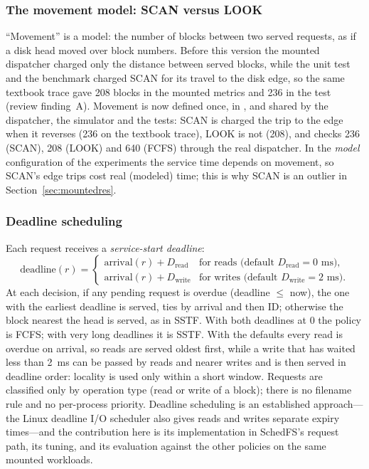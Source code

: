\documentclass[12pt,a4paper]{article}
\DeclareRobustCommand{\code}[1]{\texttt{\detokenize{#1}}}
\begin{document}
\subsubsection{The movement model: SCAN versus LOOK}
\label{sec:movement}
``Movement'' is a model: the number of blocks between two served requests, as if a disk head moved over block numbers. Before this version the mounted dispatcher charged only the distance between served blocks, while the unit test and the benchmark charged SCAN for its travel to the disk edge, so the same textbook trace gave 208 blocks in the mounted metrics and 236 in the test (review finding~A). Movement is now defined once, in \code{scheduler_advance()}, and shared by the dispatcher, the simulator and the tests: SCAN is charged the trip to the edge when it reverses (236 on the textbook trace), LOOK is not (208), and \code{tests/test_regress.c} checks 236 (SCAN), 208 (LOOK) and 640 (FCFS) through the real dispatcher. In the \emph{model} configuration of the experiments the service time depends on movement, so SCAN's edge trips cost real (modeled) time; this is why SCAN is an outlier in Section~\ref{sec:mountedres}.

\subsubsection{Deadline scheduling}
\label{sec:deadline}
Each request receives a \emph{service-start deadline}:
\begin{equation}
\text{deadline}(r) =
\begin{cases}
\text{arrival}(r) + D_{\text{read}} & \text{for reads (default } D_{\text{read}} = 0\text{ ms)},\\
\text{arrival}(r) + D_{\text{write}} & \text{for writes (default } D_{\text{write}} = 2\text{ ms)}.
\end{cases}
\label{eq:deadline}
\end{equation}
At each decision, if any pending request is overdue (deadline $\le$ now), the one with the earliest deadline is served, ties by arrival and then ID; otherwise the block nearest the head is served, as in SSTF. With both deadlines at 0 the policy is FCFS; with very long deadlines it is SSTF. With the defaults every read is overdue on arrival, so reads are served oldest first, while a write that has waited less than 2~ms can be passed by reads and nearer writes and is then served in deadline order: locality is used only within a short window. Requests are classified only by operation type (read or write of a block); there is no filename rule and no per-process priority. Deadline scheduling is an established approach---the Linux deadline I/O scheduler also gives reads and writes separate expiry times---and the contribution here is its implementation in SchedFS's request path, its tuning, and its evaluation against the other policies on the same mounted workloads.
\end{document}
